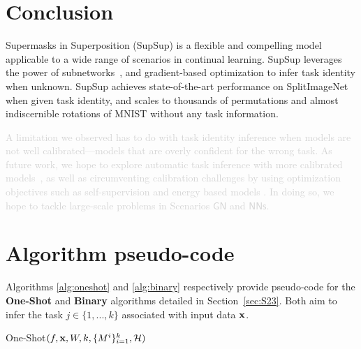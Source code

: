 \documentclass{article}
\DeclareMathOperator*{\argmax}{arg\,max}
\newcommand{\ac}{SupSup\xspace}
\newcommand{\comments}[1]{#1}
\newcommand{\comments}[1]{}
\newcommand{\removed}[1]{\comments{\textcolor{lightgray}{#1}}}
\newcommand{\casename}[1]{\ensuremath{\mathsf{#1}}\xspace}
\begin{document}
\section{Conclusion}
\vspace*{-1ex}
Supermasks in Superposition (\ac) is a flexible and compelling model applicable to a wide range of scenarios in continual learning. \ac leverages the power of subnetworks\removed{~\cite{zhou2019deconstructing, ramanujan2019s, mallya2018packnet}}, and gradient-based optimization to infer task identity when unknown. 
\ac achieves state-of-the-art performance on SplitImageNet when given task identity, and scales to thousands of permutations and almost indiscernible rotations of MNIST without any task information. 

\removed{A limitation we observed has to do with task identity inference when models are not well calibrated---models that are overly confident for the wrong task. As future work, we hope to explore
automatic task inference with more calibrated models~\cite{guo2017calibration}, as well as circumventing calibration challenges by using  optimization objectives such as self-supervision \cite{he2019momentum} and energy based models \cite{grathwohl2019your}. In doing so, we hope to tackle large-scale problems in Scenarios \casename{GN} and \casename{NNs}.}

{


}

\clearpage

\appendix

\setcounter{figure}{7} 
\section{Algorithm pseudo-code} \label{sec:pseudo}
Algorithms \ref{alg:oneshot} and \ref{alg:binary} respectively provide pseudo-code for the \textbf{One-Shot} and \textbf{Binary} algorithms detailed in Section~\ref{sec:S23}. Both aim to infer the task $j \in \{1,...,k\}$ associated with input data $\mathbf{x}$.

\begin{algorithm}[tb]
\caption{One-Shot$(f, \mathbf{x}, W, k, \{M^i\}_{i=1}^k, \mathcal{H})$} \label{alg:oneshot}
\begin{algorithmic}[1]
\STATE{$\textbf{return} \ \argmax_i  \round{- \frac{ \partial \Hcal\round{\p}}{\partial \alpha_i}}$}
\end{algorithmic}
\end{algorithm}
\end{document}
